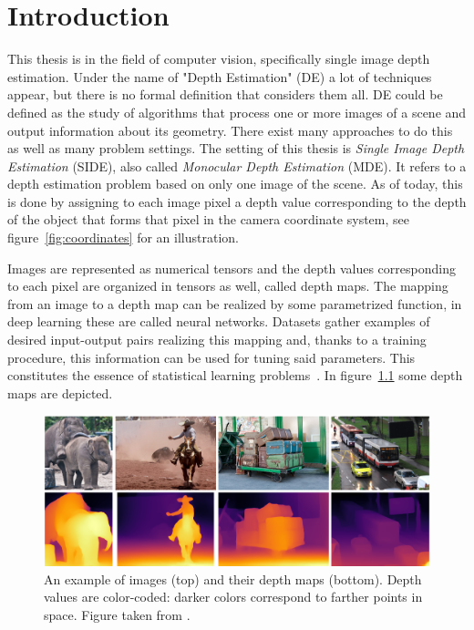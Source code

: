 \chapter{Introduction}
\label{ch:intro}

This thesis is in the field of computer vision, specifically single image depth estimation.
Under the name of "Depth Estimation" (DE) a lot of techniques appear, but there is no formal definition that considers them all.
DE could be defined as the study of algorithms that process one or more images of a scene and output information about its geometry.
There exist many approaches to do this as well as many problem settings.
The setting of this thesis is \textit{Single Image Depth Estimation} (SIDE), also called \textit{Monocular Depth Estimation} (MDE).
It refers to a depth estimation problem based on only one image of the scene.
As of today, this is done by assigning to each image pixel a depth value corresponding to the depth of the object that forms that pixel in the camera coordinate system, see figure~\ref{fig:coordinates} for an illustration.

Images are represented as numerical tensors and the depth values corresponding to each pixel are organized in tensors as well, called depth maps.
The mapping from an image to a depth map can be realized by some parametrized function, in deep learning these are called neural networks.
Datasets gather examples of desired input-output pairs realizing this mapping and, thanks to a training procedure, this information can be used for tuning said parameters.
This constitutes the essence of statistical learning problems~\cite{ML_book}.
In figure~\ref{fig:depth_maps_example} some depth maps are depicted.
\begin{figure}
    \centering
    \includegraphics[scale=0.3]{figs/depth_maps_example}
    \caption{
        An example of images (top) and their depth maps (bottom).
        Depth values are color-coded: darker colors correspond to farther points in space.
        Figure taken from \cite{MiDas}.
        \label{fig:depth_maps_example}
    }
\end{figure}

